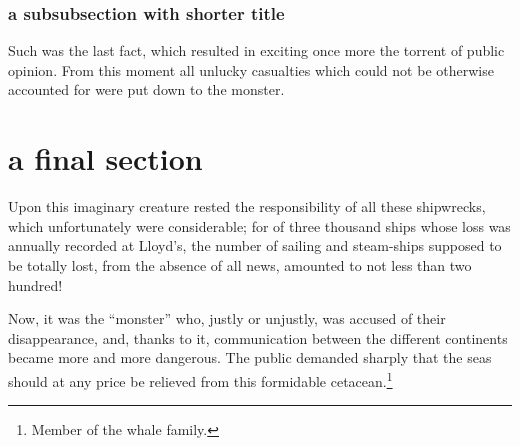 \subsubsection{a subsubsection with shorter title}

Such was the last fact, which resulted in exciting once more the torrent
of public opinion.  From this moment all unlucky casualties which could
not be otherwise accounted for were put down to the monster.

\section{a final section}

Upon this imaginary creature rested the responsibility of all
these shipwrecks, which unfortunately were considerable;
for of three thousand ships whose loss was annually recorded
at Lloyd's, the number of sailing and steam-ships supposed
to be totally lost, from the absence of all news, amounted to
not less than two hundred!

Now, it was the ``monster'' who, justly or unjustly, was accused
of their disappearance, and, thanks to it, communication between
the different continents became more and more dangerous.
The public demanded sharply that the seas should at any price be
relieved from this formidable cetacean.\footnote{Member of the whale family.}

